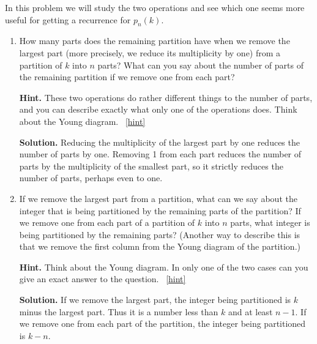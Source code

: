 \documentclass{book}
\begin{document}
\setcounter{project}{215}
\addtocounter{project}{-1}
\begin{activity}[]\label{numberpartitionrecurrence}
\hypertarget{p-1170}{}%
In this problem we will study the two operations and see which one seems more useful for getting a recurrence for \(p_n(k)\).%
\begin{enumerate}[font=\bfseries,label=(\alph*),ref=\alph*]
\item\label{task-220} \hypertarget{p-1171}{}%
How many parts does the remaining partition have when we remove the largest part (more precisely, we reduce its multiplicity by one) from a partition of \(k\) into \(n\) parts?  What can you say about the number of parts of the remaining partition if we remove one from each part?%
\par\smallskip%
\noindent\textbf{Hint.}\hypertarget{hint-134}{}\quad%
\hypertarget{p-1172}{}%
These two operations do rather different things to the number of parts, and you can describe exactly what only one of the operations does. Think about the Young diagram.%
~\hfill{\tiny\hyperlink{a-215.a}{[hint]}\hypertarget{q-215.a}{}}\par\smallskip%
\noindent\textbf{Solution.}\hypertarget{solution-115}{}\quad%
\hypertarget{p-1173}{}%
Reducing the multiplicity of the largest part by one reduces the number of parts by one. Removing 1 from each part reduces the number of parts by the multiplicity of the smallest part, so it strictly reduces the number of parts, perhaps even to one.%
\item\label{task-221} \hypertarget{p-1174}{}%
If we remove the largest part from a partition, what can we say about the integer that is being partitioned by the remaining parts of the partition? If we remove one from each part of a partition of \(k\) into \(n\) parts, what integer is being partitioned by the remaining parts? (Another way to describe this is that we remove the first column from the Young diagram of the partition.)%
\par\smallskip%
\noindent\textbf{Hint.}\hypertarget{hint-135}{}\quad%
\hypertarget{p-1175}{}%
Think about the Young diagram. In only one of the two cases can you give an exact answer to the question.%
~\hfill{\tiny\hyperlink{a-215.b}{[hint]}\hypertarget{q-215.b}{}}\par\smallskip%
\noindent\textbf{Solution.}\hypertarget{solution-116}{}\quad%
\hypertarget{p-1176}{}%
If we remove the largest part, the integer being partitioned is \(k\) minus the largest part. Thus it is a number less than \(k\) and at least \(n-1\). If we remove one from each part of the partition, the integer being partitioned is \(k-n\).%

\end{enumerate}
\end{activity}
\end{document}
